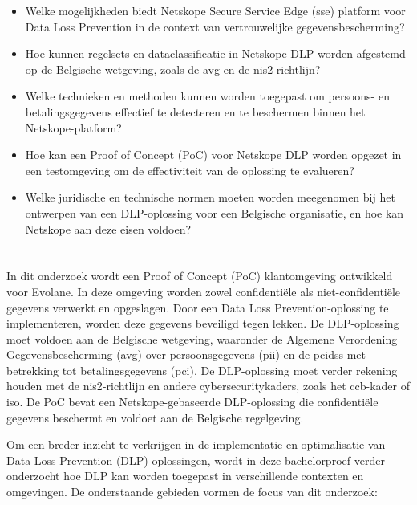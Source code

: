 \begin{itemize}
    \item Welke mogelijkheden biedt Netskope Secure Service Edge (\gls{sse}) platform voor Data Loss Prevention in de context van vertrouwelijke gegevensbescherming?
    \item Hoe kunnen regelsets en dataclassificatie in Netskope DLP worden afgestemd op de Belgische wetgeving, zoals de \gls{avg} en de \gls{nis2}-richt\-lijn?
    \item Welke technieken en methoden kunnen worden toegepast om persoons- en betalingsgegevens effectief te detecteren en te beschermen binnen het Net\-skope-platform?
    \item Hoe kan een Proof of Concept (PoC) voor Netskope DLP worden opgezet in een testomgeving om de effectiviteit van de oplossing te evalueren?
    \item Welke juridische en technische normen moeten worden meegenomen bij het ontwerpen van een DLP-oplossing voor een Belgische organisatie, en hoe kan Netskope aan deze eisen voldoen?
\end{itemize}


\section{}%
\label{sec:onderzoeksdoelstelling}

In dit onderzoek wordt een Proof of Concept (PoC) klantomgeving ontwikkeld voor Evolane. 
In deze omgeving worden zowel confidentiële als niet-confidentiële gegevens verwerkt en opgeslagen. 
Door een Data Loss Prevention-oplossing te implementeren, worden deze gegevens beveiligd tegen lekken. De DLP-oplossing moet voldoen aan de Belgische wetgeving, 
waaronder de Algemene Verordening Gegevensbescherming (\gls{avg}) over persoonsgegevens (\gls{pii}) en de \gls{pcidss} met betrekking tot betalingsgegevens (\gls{pci}). 
De DLP-oplossing moet verder rekening houden met de \gls{nis2}-richtlijn en andere cybersecuritykaders, zoals het \gls{ccb}-kader of \gls{iso}. 
De PoC bevat een Netskope-gebaseerde DLP-oplossing die confidentiële gegevens beschermt en voldoet aan de Belgische regelgeving. 

Om een breder inzicht te verkrijgen in de implementatie en optimalisatie van Data Loss Prevention (DLP)-oplossingen, wordt in deze bachelorproef verder onderzocht hoe DLP kan worden toegepast in verschillende contexten en omgevingen. De onderstaande gebieden vormen de focus van dit onderzoek:


